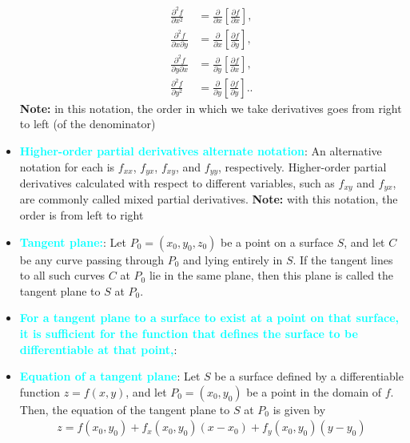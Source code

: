 \documentclass{report}
\begin{document}
\begin{itemize}
                \begin{align*}
                    \frac{\partial^2 f}{\partial x^2} &= \frac{\partial}{\partial x}\left[\frac{\partial f}{\partial x}\right], \\
                    \frac{\partial^2 f}{\partial x \partial y} &= \frac{\partial}{\partial x}\left[\frac{\partial f}{\partial y}\right], \\
                    \frac{\partial^2 f}{\partial y \partial x} &= \frac{\partial}{\partial y}\left[\frac{\partial f}{\partial x}\right], \\
                    \frac{\partial^2 f}{\partial y^2} &= \frac{\partial}{\partial y}\left[\frac{\partial f}{\partial y}\right].
                .\end{align*}
                \bigbreak \noindent 
                \textbf{Note:} in this notation, the order in which we take derivatives goes from right to left (of the denominator)
            \item \textbf{\textcolor{cyan}{Higher-order partial derivatives alternate notation}}:
                An alternative notation for each is $f_{xx}$, $f_{yx}$, $f_{xy}$, and $f_{yy}$, respectively. Higher-order partial derivatives calculated with respect to different variables, such as $f_{xy}$ and $f_{yx}$, are commonly called mixed partial derivatives.
                \bigbreak \noindent 
                \textbf{Note:} with this notation, the order is from left to right
            \item \textbf{\textcolor{cyan}{Tangent plane:}}: Let $P_0=(x_0,y_0,z_0)$ be a point on a surface $S$, and let $C$ be any curve passing through $P_0$ and lying entirely in $S$. If the tangent lines to all such curves $C$ at $P_0$ lie in the same plane, then this plane is called the tangent plane to $S$ at $P_0$.
                \bigbreak \noindent 
            \item \textbf{\textcolor{cyan}{For a tangent plane to a surface to exist at a point on that surface, it is sufficient for the function that defines the surface to be differentiable at that point,}}:
            \item \textbf{\textcolor{cyan}{Equation of a tangent plane}}: Let \(S\) be a surface defined by a differentiable function \(z = f(x, y)\), and let \(P_0 = (x_0, y_0)\) be a point in the domain of \(f\). Then, the equation of the tangent plane to \(S\) at \(P_0\) is given by
                \begin{align*}
                    z = f(x_0, y_0) + f_x(x_0, y_0)(x - x_0) + f_y(x_0, y_0)(y - y_0)

\end{align*}
\end{itemize}
\end{document}
